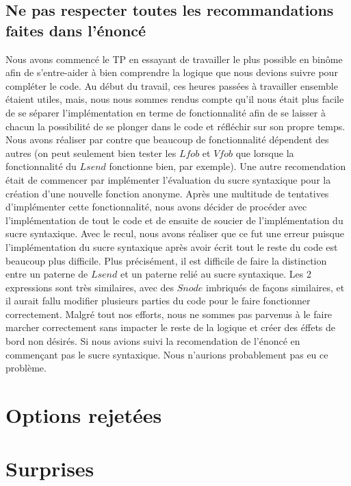 \documentclass{article}
\begin{document}
	\subsection{Ne pas respecter toutes les recommandations faites dans l'énoncé}
	Nous avons commencé le TP en essayant de travailler le plus possible en binôme
	afin de s'entre-aider à bien comprendre la logique que nous devions suivre
	pour compléter le code. Au début du travail, ces heures passées à travailler
	ensemble étaient utiles, mais, nous nous sommes rendus compte qu'il nous était
	plus facile de se séparer l'implémentation en terme de fonctionnalité afin de
	se laisser à chacun la possibilité de se plonger dans le code et réfléchir sur
	son propre temps. Nous avons réaliser par contre que beaucoup de fonctionnalité
	dépendent des autres (on peut seulement bien tester les $Lfob$ et $Vfob$ que
	lorsque la fonctionnalité du $Lsend$ fonctionne bien, par exemple). Une autre recomendation
	était de commencer par implémenter l'évaluation du sucre syntaxique pour la création
	d'une nouvelle fonction anonyme. Après une multitude de tentatives d'implémenter
	cette fonctionnalité, nous avons décider de procéder avec l'implémentation de tout
	le code et de ensuite de soucier de l'implémentation du sucre syntaxique. Avec
	le recul, nous avons réaliser que ce fut une erreur puisque l'implémentation du
	sucre syntaxique après avoir écrit tout le reste du code est beaucoup plus difficile.
	Plus précisément, il est difficile de faire la distinction entre un paterne de
	$Lsend$ et un paterne relié au sucre syntaxique. Les 2 expressions sont très
	similaires, avec des $Snode$ imbriqués de façons similaires, et il aurait
	fallu modifier plusieurs parties du code pour le faire fonctionner
	correctement. Malgré tout nos efforts, nous ne sommes pas parvenus à le faire
	marcher correctement sans impacter le reste de la logique et créer des éffets
	de bord non désirés. Si nous avions suivi la recomendation de l'énoncé en commençant
	pas le sucre syntaxique. Nous n'aurions probablement pas eu ce problème.
	\section{Options rejetées}
	\section{Surprises}
\end{document}
